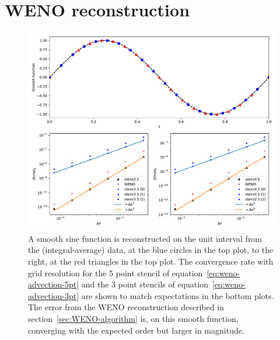 \section{WENO reconstruction}
\label{sec:WENO}

\begin{figure}
  \includegraphics[width=0.96\linewidth]{weno-convergence}
  \caption[Convergence rate of high-order reconstructions]{A smooth sine function is reconstructed on the unit interval from the (integral-average) data, at the blue circles in the top plot, to the right, at the red triangles in the top plot. The convergence rate with grid resolution for the 5 point stencil of equation~\eqref{eq:weno-advection-5pt} and the 3 point stencils of equation~\eqref{eq:weno-advection-3pt} are shown to match expectations in the bottom plots. The error from the WENO reconstruction described in section~\ref{sec:WENO-algorithm} is, on this smooth function, converging with the expected order but larger in magnitude.}
  \label{fig:weno-convergence}
\end{figure}

